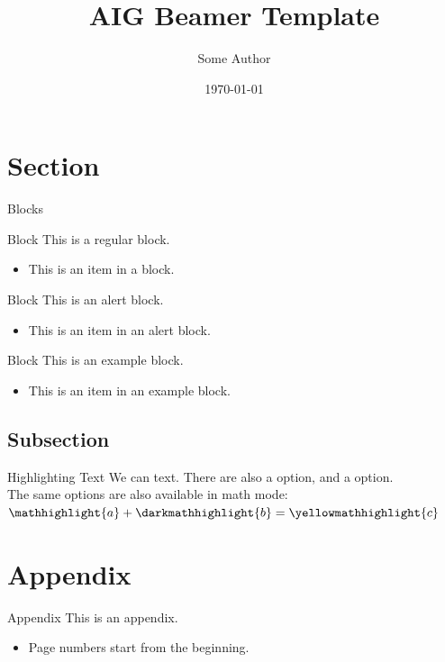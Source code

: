 \documentclass[aspectratio=169]{beamer} %
\title{AIG Beamer Template}
\author[S. Author]{Some Author}
\institute{Artificial Intelligence Group,\\
University of Hagen, Germany}
\date{\today}
\begin{document}

\begin{frame}
  \titlepage
\end{frame}
\nologo

\section{Section}

\begin{frame}{Blocks}
    \begin{block}{Block}
        This is a regular block.
        \begin{itemize}
            \item This is an item in a block.
        \end{itemize}
    \end{block}
    
    \begin{alertblock}{Block}
        This is an alert block.
        \begin{itemize}
            \item This is an item in an alert block.
        \end{itemize}
    \end{alertblock}
    
    \begin{exampleblock}{Block}
        This is an example block.
        \begin{itemize}
            \item This is an item in an example block.
        \end{itemize}
    \end{exampleblock}
\end{frame}


\subsection{Subsection}

\begin{frame}{Highlighting Text}
    We can  text. There are also a  option, and a  option.\\
    The same options are also available in math mode: $\mathhighlight{a} + \darkmathhighlight{b} = \yellowmathhighlight{c}$
\end{frame}


\appendix

\section{Appendix}

\begin{frame}{Appendix}
    This is an appendix.
    \begin{itemize}
        \item Page numbers start from the beginning.
    \end{itemize}
\end{frame}
\end{document}
